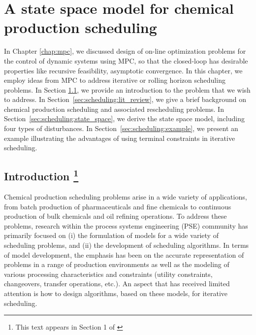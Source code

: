 \chapter{A state space model for chemical production scheduling} 
\label{chap:scheduling}

In Chapter \ref{chap:mpc}, we discussed design of on-line
optimization problems for the control of dynamic systems using MPC, so
that the closed-loop has desirable properties like recursive
feasibility, asymptotic convergence. In this chapter, we employ
ideas from MPC to address iterative or rolling horizon scheduling
problems.
In Section \ref{sec:scheduling:introduction}, we provide an introduction to
the problem that we wish to address. In
Section~\ref{sec:scheduling:lit_review}, we give a brief background 
on chemical production scheduling and associated rescheduling
problems. In Section~\ref{sec:scheduling:state_space}, we derive the
state space model, including four types of disturbances. In
Section~\ref{sec:scheduling:example}, we present an example
illustrating the advantages of using terminal constraints in iterative
scheduling.

\section{Introduction \footnote{This text appears in Section 1 of
\citet{subramanian:maravelias:rawlings:2012}}}
\label{sec:scheduling:introduction}

Chemical production scheduling problems arise in a wide variety of
applications, from batch production  of pharmaceuticals and fine
chemicals to continuous production of bulk chemicals and oil refining
operations. To address these problems, research within the process
systems engineering (PSE) community has primarily focused on (i) the
formulation of models for a wide variety of scheduling problems, and
(ii) the development of scheduling algorithms. In terms of model
development, the emphasis has been on the accurate representation of
problems in a range of production environments as well as the modeling
of various processing characteristics and constraints (\eg utility
constraints, changeovers, transfer operations,
etc.)\citep{mendez:cerda:grossmann:harjunkoski:fahl:2006}. An aspect
that has received limited attention is how to design algorithms, based
on these models, for iterative scheduling.

